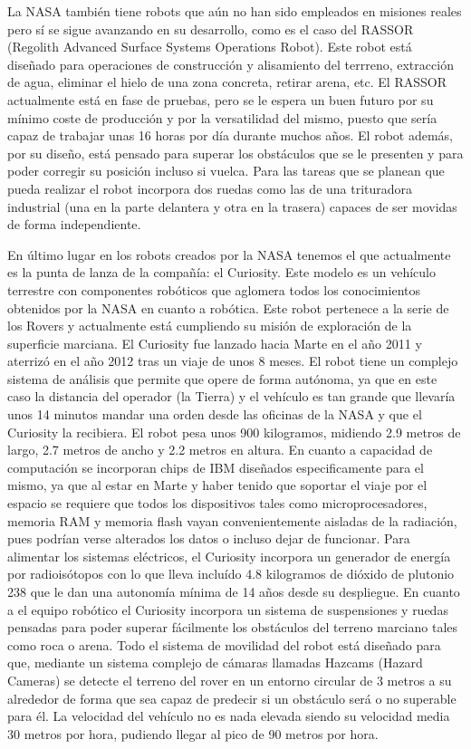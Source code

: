La NASA también tiene robots que aún no han sido empleados en misiones reales pero sí se sigue avanzando en su desarrollo, como es el caso del RASSOR (Regolith Advanced Surface Systems Operations Robot). Este robot está diseñado para operaciones de construcción y alisamiento del terrreno, extracción de agua, eliminar el hielo de una zona concreta, retirar arena, etc. El RASSOR actualmente está en fase de pruebas, pero se le espera un buen futuro por su mínimo coste de producción y por la versatilidad del mismo, puesto que sería capaz de trabajar unas 16 horas por día durante muchos años. El robot además, por su diseño, está pensado para superar los obstáculos que se le presenten y para poder corregir su posición incluso si vuelca. Para las tareas que se planean que pueda realizar el robot incorpora dos ruedas como las de una trituradora industrial (una en la parte delantera y otra en la trasera) capaces de ser movidas de forma independiente.

En último lugar en los robots creados por la NASA tenemos el que actualmente es la punta de lanza de la compañía: el Curiosity. Este modelo es un vehículo terrestre con componentes robóticos que aglomera todos los conocimientos obtenidos por la NASA en cuanto a robótica. Este robot pertenece a la serie de los Rovers y actualmente está cumpliendo su misión de exploración de la superficie marciana. El Curiosity fue lanzado hacia Marte en el año 2011 y aterrizó en el año 2012 tras un viaje de unos 8 meses. El robot tiene un complejo sistema de análisis que permite que opere de forma autónoma, ya que en este caso la distancia del operador (la Tierra) y el vehículo es tan grande que llevaría unos 14 minutos mandar una orden desde las oficinas de la NASA y que el Curiosity la recibiera. El robot pesa unos 900 kilogramos, midiendo 2.9 metros de largo, 2.7 metros de ancho y 2.2 metros en altura. En cuanto a capacidad de computación se incorporan chips de IBM diseñados especificamente para el mismo, ya que al estar en Marte y haber tenido que soportar el viaje por el espacio se requiere que todos los dispositivos tales como microprocesadores, memoria RAM y memoria flash vayan convenientemente aisladas de la radiación, pues podrían verse alterados los datos o incluso dejar de funcionar. Para alimentar los sistemas eléctricos, el Curiosity incorpora un generador de energía por radioisótopos con lo que lleva incluído 4.8 kilogramos de dióxido de plutonio 238 que le dan una autonomía mínima de 14 años desde su despliegue. En cuanto a el equipo robótico el Curiosity incorpora un sistema de suspensiones y ruedas pensadas para poder superar fácilmente los obstáculos del terreno marciano tales como roca o arena. Todo el sistema de movilidad del robot está diseñado para que, mediante un sistema complejo de cámaras llamadas Hazcams (Hazard Cameras) se detecte el terreno del rover en un entorno circular de 3 metros a su alrededor de forma que sea capaz de predecir si un obstáculo será o no superable para él. La velocidad del vehículo no es nada elevada siendo su velocidad media 30 metros por hora, pudiendo llegar al pico de 90 metros por hora.


